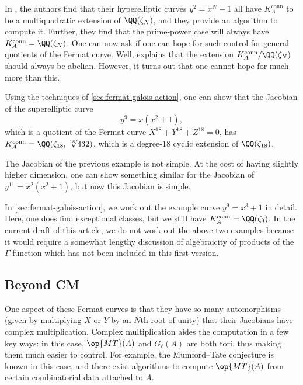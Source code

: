 \documentclass[openany]{book}
\begin{document}
In \cite[Theorem~7.1.1]{ggl-fermat}, the authors find that their hyperelliptic curves $y^2=x^N+1$ all have $K_A^{\mathrm{conn}}$ to be a multiquadratic extension of $\QQ(\zeta_N)$, and they provide an algorithm to compute it. Further, they find that the prime-power case will always have $K_A^{\mathrm{conn}}=\QQ(\zeta_N)$. One can now ask if one can hope for such control for general quotients of the Fermat curve. Well, \cite[Theorem~7.15]{deligne-hodge} explains that the extension $K_A^{\mathrm{conn}}/\QQ(\zeta_N)$ should always be abelian. However, it turns out that one cannot hope for much more than this.
\begin{example}
	Using the techniques of \cref{sec:fermat-galois-action}, one can show that the Jacobian of the superelliptic curve
	\[y^9=x\left(x^2+1\right),\]
	which is a quotient of the Fermat curve $X^{18}+Y^{18}+Z^{18}=0$, has $K_A^{\mathrm{conn}}=\QQ(\zeta_{18},\sqrt[18]{432})$, which is a degree-$18$ cyclic extension of $\QQ(\zeta_{18})$.
\end{example}
\begin{example}
	The Jacobian of the previous example is not simple. At the cost of having slightly higher dimension, one can show something similar for the Jacobian of $y^{11}=x^2\left(x^2+1\right)$, but now this Jacobian is simple.
\end{example}
In \cref{sec:fermat-galois-action}, we work out the example curve $y^9=x^3+1$ in detail. Here, one does find exceptional classes, but we still have $K_A^{\mathrm{conn}}=\QQ(\zeta_9)$. In the current draft of this article, we do not work out the above two examples because it would require a somewhat lengthy discussion of algebraicity of products of the $\Gamma$-function which has not been included in this first version.

\subsection{Beyond CM}
One aspect of these Fermat curves is that they have so many automorphisms (given by multiplying $X$ or $Y$ by an $N$th root of unity) that their Jacobians have complex multiplication. Complex multiplication aides the computation in a few key ways: in this case, $\op{MT}(A)$ and $G_\ell(A)$ are both tori, thus making them much easier to control. For example, the Mumford--Tate conjecture is known in this case, and there exist algorithms to compute $\op{MT}(A)$ from certain combinatorial data attached to $A$.
\end{document}
